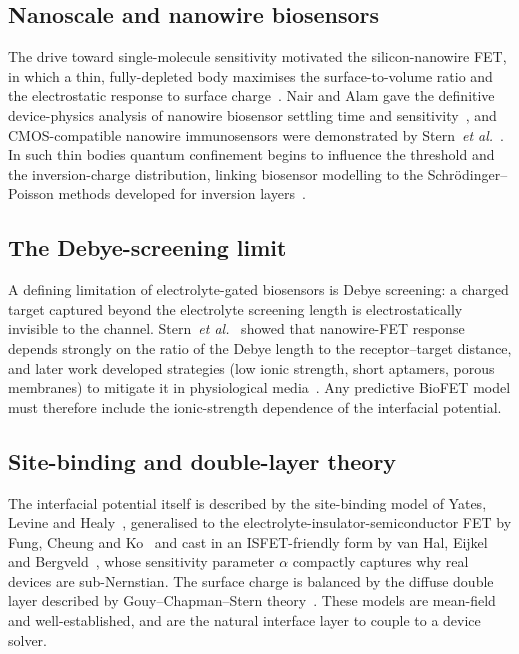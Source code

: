 \documentclass[10pt,journal]{IEEEtran}
\begin{document}
\subsection{Nanoscale and nanowire biosensors}
The drive toward single-molecule sensitivity motivated the silicon-nanowire FET,
in which a thin, fully-depleted body maximises the surface-to-volume ratio and
the electrostatic response to surface charge~\cite{cui2001,patolsky2006}. Nair and
Alam gave the definitive device-physics analysis of nanowire biosensor
settling time and sensitivity~\cite{nair2007}, and CMOS-compatible nanowire
immunosensors were demonstrated by Stern~\emph{et al.}~\cite{stern2007}. In such
thin bodies quantum confinement begins to influence the threshold and the
inversion-charge distribution, linking biosensor modelling to the
Schr\"odinger--Poisson methods developed for inversion
layers~\cite{stern1972,ando1982,trellakis1997}.

\subsection{The Debye-screening limit}
A defining limitation of electrolyte-gated biosensors is Debye screening: a
charged target captured beyond the electrolyte screening length is electrostatically
invisible to the channel. Stern~\emph{et al.}~\cite{stern2007debye} showed that
nanowire-FET response depends strongly on the ratio of the Debye length to the
receptor--target distance, and later work developed strategies (low ionic
strength, short aptamers, porous membranes) to mitigate it in physiological
media~\cite{gao2015}. Any predictive BioFET model must therefore include the
ionic-strength dependence of the interfacial potential.

\subsection{Site-binding and double-layer theory}
The interfacial potential itself is described by the site-binding model of Yates,
Levine and Healy~\cite{yates1974}, generalised to the electrolyte-insulator-semiconductor
FET by Fung, Cheung and Ko~\cite{fung1986} and cast in an ISFET-friendly form by
van Hal, Eijkel and Bergveld~\cite{vanhal1996}, whose sensitivity parameter
$\alpha$ compactly captures why real devices are sub-Nernstian. The surface charge
is balanced by the diffuse double layer described by Gouy--Chapman--Stern
theory~\cite{grahame1947,bard2001}. These models are mean-field and
well-established, and are the natural interface layer to couple to a device
solver.
\end{document}
